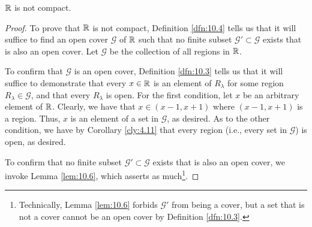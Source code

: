 \documentclass[../main.tex]{subfiles}
\begin{document}
\begin{theorem}\label{trm:10.7}
    $\mathbb{R}$ is not compact.
    \begin{proof}
        To prove that $\mathbb{R}$ is not compact, Definition \ref{dfn:10.4} tells us that it will suffice to find an open cover $\mathcal{G}$ of $\mathbb{R}$ such that no finite subset $\mathcal{G}'\subset\mathcal{G}$ exists that is also an open cover. Let $\mathcal{G}$ be the collection of all regions in $\mathbb{R}$.\par
        To confirm that $\mathcal{G}$ is an open cover, Definition \ref{dfn:10.3} tells us that it will suffice to demonstrate that every $x\in\mathbb{R}$ is an element of $R_\lambda$ for some region $R_\lambda\in\mathcal{G}$, and that every $R_\lambda$ is open. For the first condition, let $x$ be an arbitrary element of $\mathbb{R}$. Clearly, we have that $x\in(x-1,x+1)$ where $(x-1,x+1)$ is a region. Thus, $x$ is an element of a set in $\mathcal{G}$, as desired. As to the other condition, we have by Corollary \ref{cly:4.11} that every region (i.e., every set in $\mathcal{G}$) is open, as desired.\par
        To confirm that no finite subset $\mathcal{G}'\subset\mathcal{G}$ exists that is also an open cover, we invoke Lemma \ref{lem:10.6}, which asserts as much\footnote{Technically, Lemma \ref{lem:10.6} forbids $\mathcal{G}'$ from being a cover, but a set that is not a cover cannot be an open cover by Definition \ref{dfn:10.3}.}.
    \end{proof}
\end{theorem}
\end{document}
